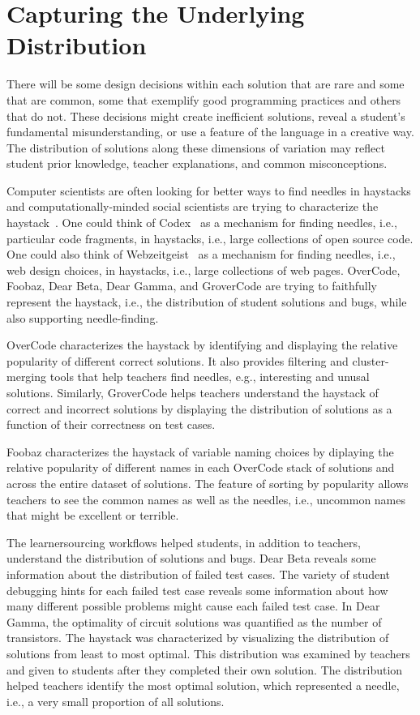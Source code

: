 \section{Capturing the Underlying Distribution}

There will be some design decisions within each solution that are rare and some that are common, some that exemplify good programming practices and others that do not. These decisions might create inefficient solutions, reveal a student's fundamental misunderstanding, or use a feature of the language in a creative way. The distribution of solutions along these dimensions of variation may reflect student prior knowledge, teacher explanations, and common misconceptions. 

Computer scientists are often looking for better ways to find needles in haystacks and computationally-minded social scientists are trying to characterize the haystack~\cite{wallachHaystack}. One could think of Codex~\cite{codex} as a mechanism for finding needles, i.e., particular code fragments, in haystacks, i.e., large collections of open source code. One could also think of Webzeitgeist~\cite{webzeitgeist} as a mechanism for finding needles, i.e., web design choices, in haystacks, i.e., large collections of web pages. OverCode, Foobaz, Dear Beta, Dear Gamma, and GroverCode are trying to faithfully represent the haystack, i.e., the distribution of student solutions and bugs, while also supporting needle-finding.

OverCode characterizes the haystack by identifying and displaying the relative popularity of different correct solutions. It also provides filtering and cluster-merging tools that help teachers find needles, e.g., interesting and unusal solutions. Similarly, GroverCode helps teachers understand the haystack of correct and incorrect solutions by displaying the distribution of solutions as a function of their correctness on test cases.

Foobaz characterizes the haystack of variable naming choices by diplaying the relative popularity of different names in each OverCode stack of solutions and across the entire dataset of solutions. The feature of sorting by popularity allows teachers to see the common names as well as the needles, i.e., uncommon names that might be excellent or terrible. 

The learnersourcing workflows helped students, in addition to teachers, understand the distribution of solutions and bugs. Dear Beta reveals some information about the distribution of failed test cases. The variety of student debugging hints for each failed test case reveals some information about how many different possible problems might cause each failed test case. In Dear Gamma, the optimality of circuit solutions was quantified as the number of transistors. The haystack was characterized by visualizing the distribution of solutions from least to most optimal. This distribution was examined by teachers and given to students after they completed their own solution. The distribution helped teachers identify the most optimal solution, which represented a needle, i.e., a very small proportion of all solutions.

